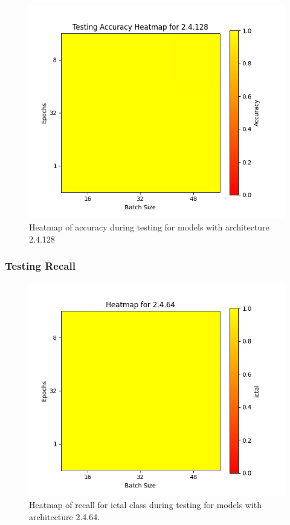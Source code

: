 \documentclass[12pt]{article}
\begin{document}
\begin{figure}[H]
\includegraphics[width=\textwidth]{heatmap_testing_accuracy_2.4.128}
\centering
\caption{Heatmap of accuracy during testing for models with architecture 2.4.128}
\label{fig:time-metrics}
\end{figure}


\subsubsection{Testing Recall}

\begin{figure}[H]
\includegraphics[width=\textwidth]{heatmap_recall_ictal_2.4.64}
\centering
\caption{Heatmap of recall for ictal class during testing for models with architecture 2.4.64.}
\label{fig:time-metrics}
\end{figure}
\end{document}
